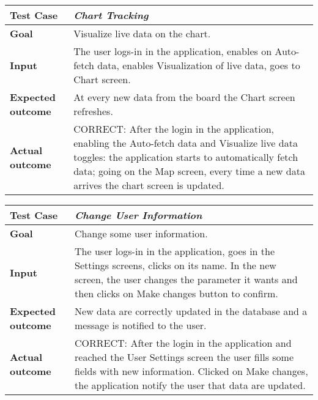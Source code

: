 \begin{table}[H]
\begin{tabular}{| p{} | p{} |}
  \hline
  \textbf{Test Case} & \textit{Chart Tracking} \\ \hline
  \textbf{Goal} & Visualize live data on the chart. \\ \hline
  \textbf{Input} & The user logs-in in the application, enables on Auto-fetch data, enables Visualization of live data, goes to Chart screen. \\ \hline
  \textbf{Expected outcome} & At every new data from the board the Chart screen refreshes. \\ \hline
  \textbf{Actual outcome} & CORRECT: After the login in the application, enabling the Auto-fetch data and Visualize live data toggles: the application starts to automatically fetch data; going on the Map screen, every time a new data arrives the chart screen is updated. \\ \hline
\end{tabular}
\end{table}

\begin{table}[H]
\begin{tabular}{| p{} | p{} |}
  \hline
  \textbf{Test Case} & \textit{Change User Information} \\ \hline
  \textbf{Goal} & Change some user information. \\ \hline
  \textbf{Input} & The user logs-in in the application, goes in the Settings screens, clicks on its name. In the new screen, the user changes the parameter it wants and then clicks on Make changes button to confirm. \\ \hline
  \textbf{Expected outcome} & New data are correctly updated in the database and a message is notified to the user. \\ \hline
  \textbf{Actual outcome} & CORRECT: After the login in the application and reached the User Settings screen the user fills some fields with new information. Clicked on Make changes, the application notify the user that data are updated.\\ \hline
\end{tabular}
\end{table}

